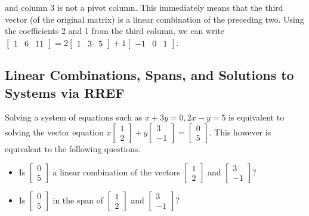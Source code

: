 \documentclass[10pt]{article}
\begin{document}
and column 3 is not a pivot column. This immediately means that the third vector (of the original matrix) is a linear combination of the preceding two. Using the coefficients 2 and 1 from the third column, we can write 
$\begin{bmatrix} 1&6&11\end{bmatrix}  = 2 \begin{bmatrix} 1&3&5\end{bmatrix}+1\begin{bmatrix} -1&0&1\end{bmatrix}$. 

\subsection{Linear Combinations, Spans, and Solutions to Systems via RREF}
Solving a system of equations such as $x+3y=0, 2x-y=5$ is equivalent to solving the vector equation 
$x\begin{bmatrix} 1\\2\end{bmatrix}+y\begin{bmatrix} 3\\-1\end{bmatrix}=\begin{bmatrix} 0\\5\end{bmatrix}$. This however is equivalent to the following questions.
\begin{itemize}
	\item Is $\begin{bmatrix} 0\\5\end{bmatrix}$ a linear combination of the vectors $\begin{bmatrix} 1\\2\end{bmatrix}$ and $\begin{bmatrix} 3\\-1\end{bmatrix}$?
	\item Is $\begin{bmatrix} 0\\5\end{bmatrix}$ in the span of $\begin{bmatrix} 1\\2\end{bmatrix}$ and $\begin{bmatrix} 3\\-1\end{bmatrix}$?
\end{itemize}
\end{document}
